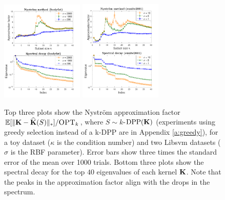 \documentclass{article}
\begin{document}
\begin{figure}[t]
   \hspace{-6mm}
  \includegraphics[width=0.35\textwidth]{figs/nystrom/rbf-bodyfat-double}
  \hspace{-6mm}
  \includegraphics[width=0.35\textwidth]{figs/nystrom/rbf-eunite2001-double}
  \vspace{-10mm}
  \fi
  \caption{Top three plots show the Nystr\"om approximation factor $\mathbb E[\|\mathbf K-{\widehat{\mathbf K}}(S)\|_*]/{\textsc{OPT}_k}$,
    where $S\sim k$-${\mathrm{DPP}}(\mathbf K)$ (experiments using greedy selection
    instead of a k-DPP are in Appendix \ref{a:greedy}), for a toy dataset
    ($\kappa$ is the condition number) and two
    Libsvm datasets ($\sigma$ is the RBF parameter). Error bars show three times the standard
    error  of the mean over 1000 trials. Bottom three plots show the spectral decay for  the
  top $40$ eigenvalues  of each kernel $\mathbf K$. Note that the
  peaks in the approximation factor align with the drops in
  the spectrum.}
\vspace{-2mm}
  \label{f:rbf}
\end{figure}
\end{document}
